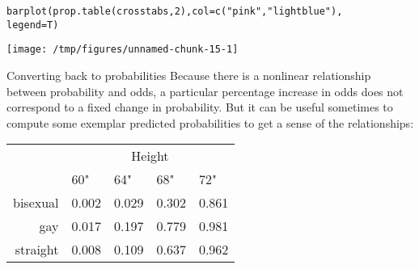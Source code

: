 \documentclass{beamer}\usepackage[]{graphicx}\usepackage[]{color}
\makeatletter
\def\maxwidth{ %
  \ifdim\Gin@nat@width>\linewidth
    \linewidth
  \else
    \Gin@nat@width
  \fi
}
\newcommand{\hlnum}[1]{\textcolor[rgb]{0.824,0.412,0.118}{#1}}%
\newcommand{\hlstr}[1]{\textcolor[rgb]{1,0.894,0.71}{#1}}%
\newcommand{\hlopt}[1]{\textcolor[rgb]{1,0.894,0.769}{#1}}%
\newcommand{\hlstd}[1]{\textcolor[rgb]{1,0.894,0.769}{#1}}%
\newcommand{\hlkwb}[1]{\textcolor[rgb]{0.804,0.776,0.451}{#1}}%
\newcommand{\hlkwc}[1]{\textcolor[rgb]{0.78,0.941,0.545}{#1}}%
\newcommand{\hlkwd}[1]{\textcolor[rgb]{1,0.78,0.769}{#1}}%
\newenvironment{kframe}{%
 \def\at@end@of@kframe{}%
 \ifinner\ifhmode%
  \def\at@end@of@kframe{\end{minipage}}%
  \begin{minipage}{\columnwidth}%
 \fi\fi%
 \def\FrameCommand##1{\hskip\@totalleftmargin \hskip-\fboxsep
 \colorbox{shadecolor}{##1}\hskip-\fboxsep
     \hskip-\linewidth \hskip-\@totalleftmargin \hskip\columnwidth}%
 \MakeFramed {\advance\hsize-\width
   \@totalleftmargin\z@ \linewidth\hsize
   \@setminipage}}%
 {\par\unskip\endMakeFramed%
 \at@end@of@kframe}
\newenvironment{knitrout}{}{} %
\makeatother
\begin{document}
\begin{darkframes}

    \begin{frame}[fragile]
      \fontsm
\begin{knitrout}
\color{fgcolor}\begin{kframe}
\begin{alltt}
\hlkwd{barplot}\hlstd{(}\hlkwd{prop.table}\hlstd{(crosstabs,} \hlnum{2}\hlstd{),} \hlkwc{col}\hlstd{=}\hlkwd{c}\hlstd{(}\hlstr{"pink"}\hlstd{,} \hlstr{"lightblue"}\hlstd{),}
  \hlkwc{legend}\hlstd{=T)}
\end{alltt}
\end{kframe}
\texttt{[image: /tmp/figures/unnamed-chunk-15-1]} 

\end{knitrout}
    \end{frame}

    \begin{frame}{Converting back to probabilities}
      Because there is a nonlinear relationship between probability and odds, a particular percentage increase in odds does not correspond to a fixed change in probability. But it can be useful sometimes to compute some exemplar predicted probabilities to get a sense of the relationships:

      

      \begin{center}
        \begin{tabular}{r|llll}
          & \multicolumn{4}{c}{Height} \\
          & 60" & 64" & 68" & 72" \\
          \hline
          bisexual
            & 0.002
            & 0.029
            & 0.302
            & 0.861
            \\
          gay
            & 0.017
            & 0.197
            & 0.779
            & 0.981
            \\
          straight
            & 0.008
            & 0.109
            & 0.637
            & 0.962
            \\
        \end{tabular}
      \end{center}
    \end{frame}


\end{darkframes}
\end{document}
